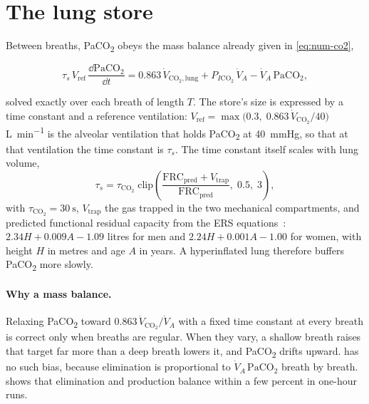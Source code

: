 \section{The lung store}
\label{sec:co2-lung}
Between breaths, PaCO\textsubscript{2} obeys the mass balance already given in \cref{eq:num-co2},
\begin{keyequation}
\begin{equation}
\tau_s\,V_{\mathrm{ref}}\,\frac{\dd\mathrm{PaCO_2}}{\dd t} = 0.863\,\dot V_{\mathrm{CO_2,lung}} + P_{I\mathrm{CO_2}}\,\dot V_A - \dot V_A\,\mathrm{PaCO_2},
\label{eq:co2-lung}
\end{equation}
\end{keyequation}
solved exactly over each breath of length $T$. The store's size is expressed by a time constant and a reference ventilation: $V_{\mathrm{ref}} = \max\bigl(0.3,\;0.863\,\dot V_{\mathrm{CO_2}}/40\bigr)$ \si{\liter\per\minute} is the alveolar ventilation that holds PaCO\textsubscript{2} at \SI{40}{\mmHg}, so that at that ventilation the time constant is $\tau_s$. The time constant itself scales with lung volume,
\begin{equation}
\tau_s = \tau_{\mathrm{CO_2}}\;\mathrm{clip}\!\left(\frac{\mathrm{FRC_{pred}} + V_{\mathrm{trap}}}{\mathrm{FRC_{pred}}},\;0.5,\;3\right),
\label{eq:co2-tau}
\end{equation}
with $\tau_{\mathrm{CO_2}} = \SI{30}{\second}$, $V_{\mathrm{trap}}$ the gas trapped in the two mechanical compartments, and predicted functional residual capacity from the ERS equations~\citep{quanjer1993}: $2.34H + 0.009A - 1.09$ litres for men and $2.24H + 0.001A - 1.00$ for women, with height $H$ in metres and age $A$ in years. A hyperinflated lung therefore buffers PaCO\textsubscript{2} more slowly.

\paragraph{Why a mass balance.} Relaxing PaCO\textsubscript{2} toward $0.863\,\dot V_{\mathrm{CO_2}}/\dot V_A$ with a fixed time constant at every breath is correct only when breaths are regular. When they vary, a shallow breath raises that target far more than a deep breath lowers it, and PaCO\textsubscript{2} drifts upward.  has no such bias, because elimination is proportional to $\dot V_A\,\mathrm{PaCO_2}$ breath by breath.  shows that elimination and production balance within a few percent in one-hour runs.

